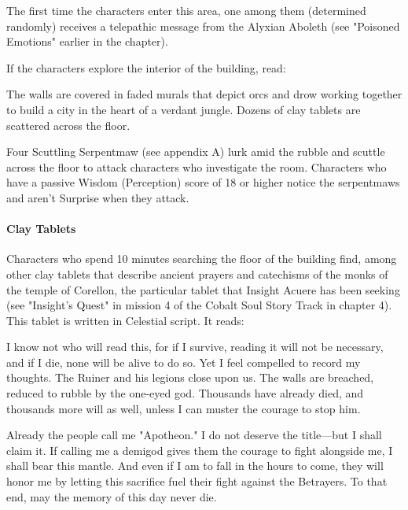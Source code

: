 \documentclass[10pt,a4paper,twoside,twocolumn,openany,nodeprecatedcode]{dndbook}
\begin{document}
The first time the characters enter this area, one among them (determined randomly) receives a telepathic message from the Alyxian Aboleth (see "Poisoned Emotions" earlier in the chapter).

If the characters explore the interior of the building, read:

\begin{DndReadAloud}{}
The walls are covered in faded murals that depict orcs and drow working together to build a city in the heart of a verdant jungle. Dozens of clay tablets are scattered across the floor.

\end{DndReadAloud}

Four Scuttling Serpentmaw (see appendix A) lurk amid the rubble and scuttle across the floor to attack characters who investigate the room. Characters who have a passive Wisdom (Perception) score of 18 or higher notice the serpentmaws and aren't Surprise when they attack.

\paragraph{Clay Tablets}
Characters who spend 10 minutes searching the floor of the building find, among other clay tablets that describe ancient prayers and catechisms of the monks of the temple of Corellon, the particular tablet that Insight Acuere has been seeking (see "Insight's Quest" in mission 4 of the Cobalt Soul Story Track in chapter 4). This tablet is written in Celestial script. It reads:

\begin{DndReadAloud}{}
I know not who will read this, for if I survive, reading it will not be necessary, and if I die, none will be alive to do so. Yet I feel compelled to record my thoughts. The Ruiner and his legions close upon us. The walls are breached, reduced to rubble by the one-eyed god. Thousands have already died, and thousands more will as well, unless I can muster the courage to stop him.

Already the people call me "Apotheon." I do not deserve the title—but I shall claim it. If calling me a demigod gives them the courage to fight alongside me, I shall bear this mantle. And even if I am to fall in the hours to come, they will honor me by letting this sacrifice fuel their fight against the Betrayers. To that end, may the memory of this day never die.

\end{DndReadAloud}
\end{document}

